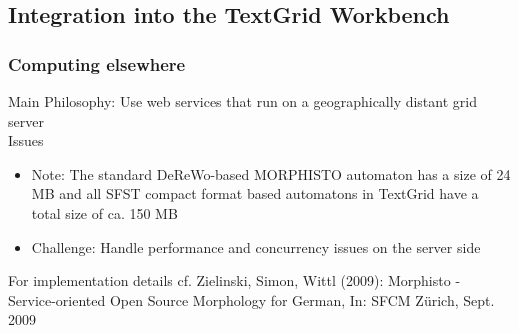 \documentclass {beamer}
\begin{document}
\subsection{Integration into the TextGrid Workbench}
\frame
{  \frametitle{Computing elsewhere}
Main Philosophy: Use web services that run on a geographically distant grid server\\
Issues
\begin{itemize} 
\item Note: The standard DeReWo-based MORPHISTO automaton has a size of 24 MB and all SFST compact format based automatons in TextGrid have a total size of ca. 150 MB
\item Challenge: Handle performance and concurrency issues on the server side\\
\end{itemize}
For implementation details cf. Zielinski, Simon, Wittl (2009): Morphisto - Service-oriented Open Source Morphology for German, In: SFCM Zürich, Sept. 2009
}

\end{document}
